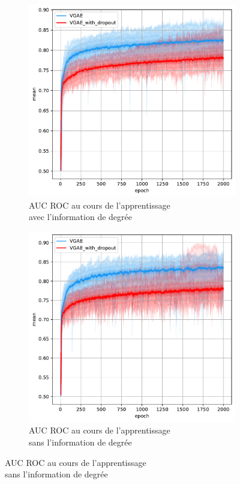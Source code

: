 \documentclass{article}
\begin{document}
\begin{figure}
    \begin{subfigure}{0.45\textwidth}
      \includegraphics[width=\textwidth]{graphics/AUCs_degree_dropout_cinf.svg.pdf}
      \centering
      \caption{AUC ROC au cours de l'apprentissage\\ avec l'information de degrée}
    \end{subfigure}
    \begin{subfigure}{0.45\textwidth}
      \includegraphics[width=\textwidth]{graphics/AUCs_no_degree_dropout_cinf.svg.pdf}
      \centering
      \caption{AUC ROC au cours de l'apprentissage\\ sans l'information de degrée}
    \end{subfigure}
\end{figure}
\end{document}

